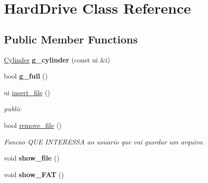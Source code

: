 \hypertarget{classHardDrive}{}\section{Hard\+Drive Class Reference}
\label{classHardDrive}
\subsection*{Public Member Functions}
\begin{DoxyCompactItemize}
\item 
\hyperlink{classCylinder}{Cylinder} {\bfseries g\+\_\+cylinder} (const ui \&i)\hypertarget{classHardDrive_abc9084285a1cf0576596db2d9ef0c99b}{}\label{classHardDrive_abc9084285a1cf0576596db2d9ef0c99b}

\item 
bool {\bfseries g\+\_\+full} ()\hypertarget{classHardDrive_a40c97bea8fb3073d24fddf2d88ab1d38}{}\label{classHardDrive_a40c97bea8fb3073d24fddf2d88ab1d38}

\item 
ui \hyperlink{classHardDrive_abe41cc759c1ef69c3588cac961a13bed}{insert\+\_\+file} ()\hypertarget{classHardDrive_abe41cc759c1ef69c3588cac961a13bed}{}\label{classHardDrive_abe41cc759c1ef69c3588cac961a13bed}

\begin{DoxyCompactList}\small\item\em public \end{DoxyCompactList}\item 
bool \hyperlink{classHardDrive_a029807e52c15e36d3daabf18a5518f11}{remove\+\_\+file} ()\hypertarget{classHardDrive_a029807e52c15e36d3daabf18a5518f11}{}\label{classHardDrive_a029807e52c15e36d3daabf18a5518f11}

\begin{DoxyCompactList}\small\item\em Funcao Q\+UE I\+N\+T\+E\+R\+E\+S\+SA ao usuario que vai gusrdar um arquivo. \end{DoxyCompactList}\item 
void {\bfseries show\+\_\+file} ()\hypertarget{classHardDrive_a950c4bdeb4f2e6b312d8c543e605830f}{}\label{classHardDrive_a950c4bdeb4f2e6b312d8c543e605830f}

\item 
void {\bfseries show\+\_\+\+F\+AT} ()\hypertarget{classHardDrive_a504d5ac923ed97b3400cb96e721c1f00}{}\label{classHardDrive_a504d5ac923ed97b3400cb96e721c1f00}

\end{DoxyCompactItemize}
